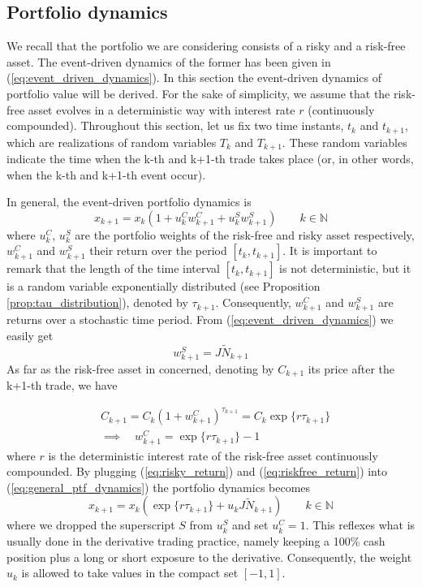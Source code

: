 \subsection{Portfolio dynamics}
We recall that the portfolio we are considering consists of a risky and a risk-free asset. The event-driven dynamics of the former has been given in (\ref{eq:event_driven_dynamics}). In this section the event-driven dynamics of portfolio value will be derived. For the sake of simplicity, we assume that the risk-free asset evolves in a deterministic way with interest rate $r$ (continuously compounded). Throughout this section, let us fix two time instants, $t_k$ and $t_{k+1}$, which are realizations of random variables $T_k$ and $T_{k+1}$. These random variables indicate the time when the k-th and k+1-th trade takes place (or, in other words, when the k-th and k+1-th event occur).

In general, the event-driven portfolio dynamics is
\begin{equation}\label{eq:general_ptf_dynamics}
x_{k+1} = x_k(1+u_{k}^C w_{k+1}^{C} + u_{k}^S w_{k+1}^S) \qquad k \in \mathbb{N}
\end{equation}
where $u_{k}^C$, $u_{k}^S$ are the portfolio weights of the risk-free and risky asset respectively, $w_{k+1}^{C}$ and $w_{k+1}^S$ their return over the period $[t_k,t_{k+1}]$. It is important to remark that the length of the time interval $[t_k,t_{k+1}]$ is not deterministic, but it is a random variable exponentially distributed (see Proposition \ref{prop:tau_distribution}), denoted by $\tau_{k+1}$. Consequently, $w_{k+1}^{C}$ and $w_{k+1}^S$ are returns over a stochastic time period. From (\ref{eq:event_driven_dynamics}) we easily get
\begin{equation}\label{eq:risky_return}
w_{k+1}^S=J\widetilde{N}_{k+1}
\end{equation}
As far as the risk-free asset in concerned, denoting by $C_{k+1}$ its price after the k+1-th trade, we have

\begin{align}\label{eq:riskfree_return}
	\nonumber
	&C_{k+1} = C_k(1+w_{k+1}^{C})^{\tau_{k+1}} = C_k \exp\{r \tau_{k+1}\}\\
	& \implies \quad w_{k+1}^{C} = \exp\{r \tau_{k+1}\}-1
\end{align}
where $r$ is the deterministic interest rate of the risk-free asset continuously compounded. By plugging (\ref{eq:risky_return}) and (\ref{eq:riskfree_return}) into (\ref{eq:general_ptf_dynamics}) the portfolio dynamics becomes
\begin{equation}\label{eq:ptf_dynamic_ED}
\boxed{x_{k+1}= x_k(\exp\{r\tau_{k+1}\} + u_{k}J\widetilde{N}_{k+1} ) } \qquad k \in \mathbb{N}
\end{equation}	
where we dropped the superscript $S$ from $u_{k}^S$ and set $u_k^C=1$. This reflexes what is usually done in the derivative trading practice, namely keeping a 100\% cash position plus a long or short exposure to the derivative. Consequently, the weight $u_{k}$ is allowed to take values in the compact set $[-1,1]$. 

